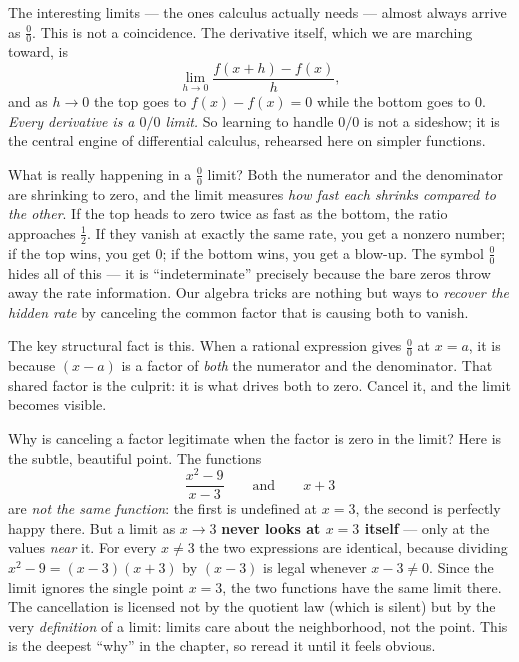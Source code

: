 The interesting limits --- the ones calculus actually needs --- almost always
arrive as $\frac{0}{0}$. This is not a coincidence. The derivative itself,
which we are marching toward, is
\[
  \lim_{h\to 0} \frac{f(x+h) - f(x)}{h},
\]
and as $h\to 0$ the top goes to $f(x)-f(x)=0$ while the bottom goes to $0$.
\emph{Every derivative is a $0/0$ limit.} So learning to handle $0/0$ is not a
sideshow; it is the central engine of differential calculus, rehearsed here
on simpler functions.

\begin{happeningbox}
What is really happening in a $\frac{0}{0}$ limit? Both the numerator and the
denominator are shrinking to zero, and the limit measures \emph{how fast each
shrinks compared to the other}. If the top heads to zero twice as fast as the
bottom, the ratio approaches $\frac12$. If they vanish at exactly the same
rate, you get a nonzero number; if the top wins, you get $0$; if the bottom
wins, you get a blow-up. The symbol $\frac{0}{0}$ hides all of this --- it is
``indeterminate'' precisely because the bare zeros throw away the rate
information. Our algebra tricks are nothing but ways to \emph{recover the
hidden rate} by canceling the common factor that is causing both to vanish.
\end{happeningbox}

The key structural fact is this. When a rational expression gives $\frac00$ at
$x=a$, it is because $(x-a)$ is a factor of \emph{both} the numerator and the
denominator. That shared factor is the culprit: it is what drives both to zero.
Cancel it, and the limit becomes visible.

\begin{whybox}
Why is canceling a factor legitimate when the factor is zero in the limit?
Here is the subtle, beautiful point. The functions
\[
  \frac{x^2 - 9}{x - 3} \qquad\text{and}\qquad x + 3
\]
are \emph{not the same function}: the first is undefined at $x=3$, the second
is perfectly happy there. But a limit as $x\to 3$ \textbf{never looks at
$x=3$ itself} --- only at the values \emph{near} it. For every $x\neq 3$ the
two expressions are identical, because dividing $x^2-9=(x-3)(x+3)$ by $(x-3)$
is legal whenever $x-3\neq 0$. Since the limit ignores the single point $x=3$,
the two functions have the same limit there. The cancellation is licensed not
by the quotient law (which is silent) but by the very \emph{definition} of a
limit: limits care about the neighborhood, not the point. This is the deepest
``why'' in the chapter, so reread it until it feels obvious.
\end{whybox}

